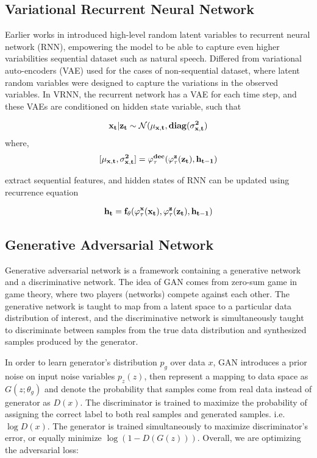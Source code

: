 \documentclass{article}
\begin{document}
\subsection{Variational Recurrent Neural Network}
Earlier works in \cite{vrnn} introduced high-level random latent variables to recurrent neural network (RNN), empowering the model to be able to capture even higher variabilities sequential dataset such as natural speech. Differed from variational auto-encoders (VAE) used for the cases of non-sequential dataset, where latent random variables were designed to capture the variations in the observed variables. In VRNN, the recurrent network has a VAE for each time step, and these VAEs are conditioned on hidden state variable, such that

$$\bf x_t \bf | z_t \sim \mathcal{N}(\bf \mu _{x,t}, diag(\sigma _{x,t}^2)$$
where,
$$[\bf \mu _{x,t}, \sigma _{x,t}^2] = \varphi^{dec}_{\tau}(\varphi^{\bf z}_{\tau}(\bf z_t),\bf h_{t-1})$$

extract sequential features, and hidden states of RNN can be updated using recurrence equation

\begin{align*}
\bf h_t = f_\theta(\varphi^{\bf x}_\tau (\bf x _t), \varphi^{\bf z}_\tau (\bf z_t), \bf h_{t-1})
\end{align*}

\subsection{Generative Adversarial Network} 

\cite{ganncm}

Generative adversarial network \cite{gan} is a framework containing a generative network and a discriminative network. The idea of GAN comes from zero-sum game in game theory, where two players (networks) compete against each other. The generative network is taught to map from a latent space to a particular data distribution of interest, and the discriminative network is simultaneously taught to discriminate between samples from the true data distribution and synthesized samples produced by the generator.

In order to learn generator's distribution $p_g$ over data $x$, GAN introduces a prior noise on input noise variables $p_z(z)$, then represent a mapping to data space as $G(z;\theta_g)$ and denote the probability that samples come from real data instead of generator as $D(x)$. The discriminator is trained to maximize the probability of assigning the correct label to both real samples and generated samples. i.e. $\log D(x)$. The generator is trained simultaneously to maximize discriminator's error, or equally minimize $\log (1-D(G(z)))$. Overall, we are optimizing the adversarial loss:
\end{document}
